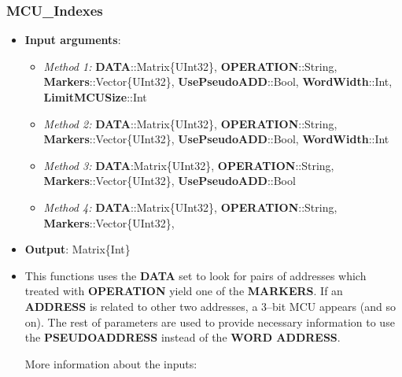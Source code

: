  \subsubsection*{MCU\_Indexes}
 \begin{itemize}
 	\item \textbf{Input arguments}: 
 		\begin{itemize}
 			\item \textit{Method 1: } \textbf{DATA}::Matrix\{UInt32\}, 
 			\textbf{OPERATION}::String, \\
 			\textbf{Markers}::Vector\{UInt32\}, 
 			\textbf{UsePseudoADD}::Bool, 
 			\textbf{WordWidth}::Int, \\
 			\textbf{LimitMCUSize}::Int
 			\item \textit{Method 2: } \textbf{DATA}::Matrix\{UInt32\}, 
 			\textbf{OPERATION}::String, \\
 			\textbf{Markers}::Vector\{UInt32\}, 
 			\textbf{UsePseudoADD}::Bool, 
 			\textbf{WordWidth}::Int
 			\item \textit{Method 3: } \textbf{DATA}:Matrix\{UInt32\}, 
 			\textbf{OPERATION}::String, \\
 			\textbf{Markers}::Vector\{UInt32\}, 
 			\textbf{UsePseudoADD}::Bool
 			\item \textit{Method 4: } \textbf{DATA}::Matrix\{UInt32\}, 
 			\textbf{OPERATION}::String,\\
 			\textbf{Markers}::Vector\{UInt32\}, 
 		\end{itemize}
 	\item \textbf{Output}: Matrix\{Int\}
 	\item This functions uses the \textbf{DATA} set to look for pairs of addresses which treated with 	 \textbf{OPERATION} yield one of the \textbf{MARKERS}. If an \textbf{ADDRESS} is related to other two addresses, 	 a 3--bit MCU appears (and so on). The rest of parameters are used to provide necessary  information to use the \textbf{PSEUDOADDRESS} instead of the \textbf{WORD ADDRESS}. 
	 
	 More information about the inputs:
	 

\end{itemize}
